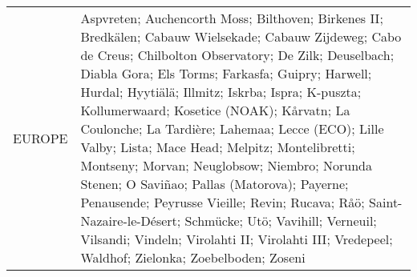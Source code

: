 \begin{table}
\begin{tabularx}{\textwidth}{lX}
  EUROPE   & Aspvreten; Auchencorth Moss; Bilthoven; Birkenes II; Bredkälen; Cabauw Wielsekade; Cabauw Zijdeweg; Cabo de Creus; Chilbolton Observatory; De Zilk; Deuselbach; Diabla Gora; Els Torms; Farkasfa; Guipry; Harwell; Hurdal; Hyytiälä; Illmitz; Iskrba; Ispra; K-puszta; Kollumerwaard; Kosetice (NOAK); Kårvatn; La Coulonche; La Tardière; Lahemaa; Lecce (ECO); Lille Valby; Lista; Mace Head; Melpitz; Montelibretti; Montseny; Morvan; Neuglobsow; Niembro; Norunda Stenen; O Saviñao; Pallas (Matorova); Payerne; Penausende; Peyrusse Vieille; Revin; Rucava; Råö; Saint-Nazaire-le-Désert; Schmücke; Utö; Vavihill; Verneuil; Vilsandi; Vindeln; Virolahti II; Virolahti III; Vredepeel; Waldhof; Zielonka; Zoebelboden; Zoseni                                                                                                                                                                                                                                                                                                                                                                                                                                                                                                                                                                                                                                                                                                                                                                                                                                                                                                                                                                                                                                                                                                                                                                                                                                                                           \\

\end{tabularx}
\end{table}
